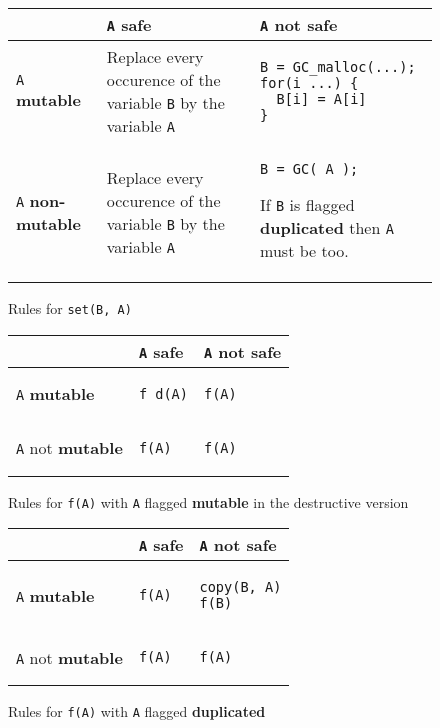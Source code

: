 \documentclass[12pt,a4paper]{article}
\newcommand{\cl}[1]{\texttt{#1}}
\newcommand{\mut}{  \textbf{ mutable } }
\newcommand{\nmut}{ \textbf{ non-mutable } }
\newcommand{\bang}{ \textbf{ mutable } }
\newcommand{\safe}{ \textbf{ safe } }
\newcommand{\dupl}{ \textbf{ duplicated } }
\begin{document}
\begin{figure}[!ht]
\begin{tabular}{|p{5.5cm}|p{5.5cm}|p{6cm}|}
\hline
             & \cl{A} \safe & \cl{A} not \safe \\ \hline
\cl{A} \mut  & Replace every occurence of the variable \cl{B} by the variable \cl{A} & \begin{lstlisting}
B = GC_malloc(...);
for(i ...) {
  B[i] = A[i]
}
\end{lstlisting} \\ \hline
\cl{A} \nmut & Replace every occurence of the variable \cl{B} by the variable \cl{A} & \begin{lstlisting}
B = GC( A );
\end{lstlisting}
If \cl{B} is flagged \dupl then \cl{A} must be too.
\\ \hline
\end{tabular}
\caption{Rules for \cl{set(B, A)}}
\end{figure}



\begin{figure}[!ht]
\begin{tabular}{|p{5.5cm}|p{5.5cm}|p{6cm}|}
\hline
             & \cl{A} \safe & \cl{A} not \safe \\ \hline
\cl{A} \bang  &
\begin{lstlisting}
f_d(A)
\end{lstlisting} & \begin{lstlisting}
f(A)
\end{lstlisting} \\ \hline
\cl{A} not \bang & \begin{lstlisting}
f(A)
\end{lstlisting} & \begin{lstlisting}
f(A)
\end{lstlisting} \\ \hline
\end{tabular}
\caption{Rules for \cl{f(A)} with \cl{A} flagged \bang in the destructive version}
\end{figure}


\begin{figure}[!ht]
\begin{tabular}{|p{5.5cm}|p{5.5cm}|p{6cm}|}
\hline
             & \cl{A} \safe & \cl{A} not \safe \\ \hline
\cl{A} \bang  &
\begin{lstlisting}
f(A)
\end{lstlisting} & \begin{lstlisting}
copy(B, A)
f(B)
\end{lstlisting} \\ \hline
\cl{A} not \bang & \begin{lstlisting}
f(A)
\end{lstlisting} & \begin{lstlisting}
f(A)
\end{lstlisting} \\ \hline
\end{tabular}
\caption{Rules for \cl{f(A)} with \cl{A} flagged \dupl}
\end{figure}
\end{document}
